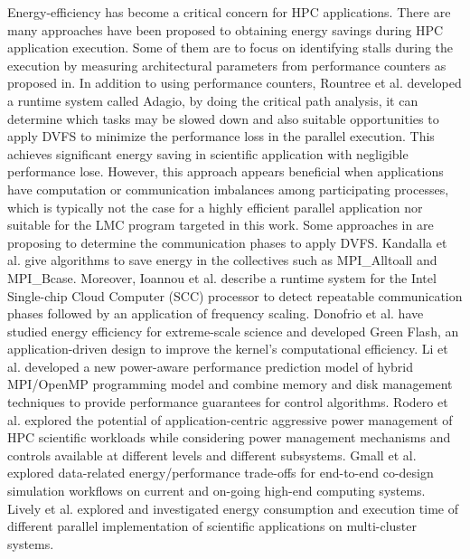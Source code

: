 \label{Section:related work}
Energy-efficiency has become a critical concern for HPC applications. There are many approaches have been proposed to obtaining energy savings during HPC application execution. Some of them are to focus on identifying stalls during the execution by measuring architectural parameters from performance counters as proposed in\cite{ge2007cpu,hsu2005power,huang2009energy}. In addition to using performance counters, Rountree et al.\cite{rountree2009adagio} developed a runtime system called Adagio, by doing the critical path analysis, it can determine which tasks may be slowed down and also suitable opportunities to apply DVFS to minimize the performance loss in the parallel execution. This achieves significant energy saving in scientific application with negligible performance lose. However, this approach appears beneficial when applications have computation or communication imbalances among participating processes, which is typically not the case for a highly efficient parallel application nor suitable for the LMC program targeted in this work. Some approaches in\cite{freeh2005using,lim2006adaptive} are proposing to determine the communication phases to apply DVFS. Kandalla et al.\cite{kandalla2010designing} give algorithms to save energy in the collectives such as MPI\_Alltoall and MPI\_Bcase. Moreover, Ioannou et al.\cite{ioannou2011phase} describe a runtime system for the Intel Single-chip Cloud Computer (SCC) processor to detect repeatable communication phases followed by an application of frequency scaling. Donofrio et al.\cite{donofrio2009energy} have studied energy efficiency for extreme-scale science and developed Green Flash, an application-driven design to improve the kernel’s computational efficiency. Li et al.\cite{li2010hybrid} developed a new power-aware performance prediction model of hybrid MPI/OpenMP programming model and combine memory and disk management techniques to provide performance guarantees for control algorithms. Rodero et al.\cite{rodero2010investigating} explored the potential of application-centric aggressive power management of HPC scientific workloads while considering power management mechanisms and controls available at different levels and different subsystems. Gmall et al.\cite{gamell2013exploring} explored data-related energy/performance trade-offs for end-to-end co-design simulation workflows on current and on-going high-end computing systems. Lively et al.\cite{lively2011energy} explored and investigated energy consumption and execution time of different parallel implementation of scientific applications on multi-cluster systems. 


